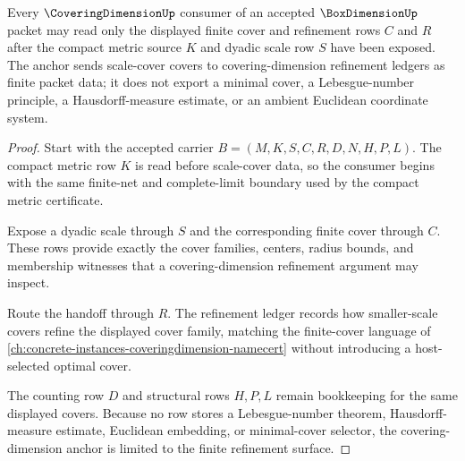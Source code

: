 \begin{theorem}
\label{thm:box-dimension-covering-dimension-anchor}
Every $\CoveringDimensionUp$ consumer of an accepted $\BoxDimensionUp$ packet may read only the displayed finite cover and refinement rows $C$ and $R$ after the compact metric source $K$ and dyadic scale row $S$ have been exposed. The anchor sends scale-cover covers to covering-dimension refinement ledgers as finite packet data; it does not export a minimal cover, a Lebesgue-number principle, a Hausdorff-measure estimate, or an ambient Euclidean coordinate system.
\end{theorem}
\begin{proof}
Start with the accepted carrier $B=(M,K,S,C,R,D,N,H,P,L)$. The compact metric row $K$ is read before scale-cover data, so the consumer begins with the same finite-net and complete-limit boundary used by the compact metric certificate.

Expose a dyadic scale through $S$ and the corresponding finite cover through $C$. These rows provide exactly the cover families, centers, radius bounds, and membership witnesses that a covering-dimension refinement argument may inspect.

Route the handoff through $R$. The refinement ledger records how smaller-scale covers refine the displayed cover family, matching the finite-cover language of \autoref{ch:concrete-instances-coveringdimension-namecert} without introducing a host-selected optimal cover.

The counting row $D$ and structural rows $H,P,L$ remain bookkeeping for the same displayed covers. Because no row stores a Lebesgue-number theorem, Hausdorff-measure estimate, Euclidean embedding, or minimal-cover selector, the covering-dimension anchor is limited to the finite refinement surface.
\end{proof}

